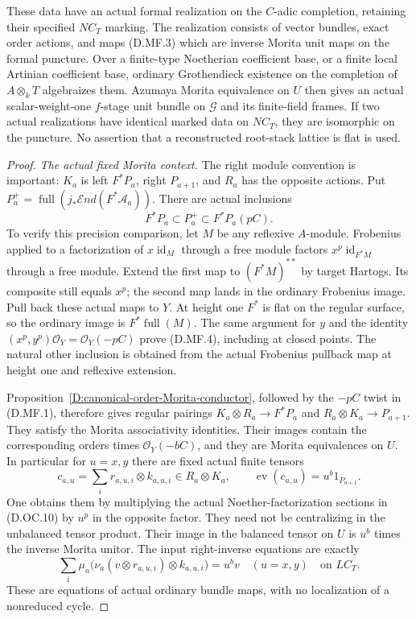 \begin{theorem}
These data have an actual formal realization on the
$C$-adic completion, retaining their specified $NC_T$ marking.
The realization consists of vector bundles, exact order
actions, and maps (D.MF.3) which are inverse Morita unit maps
on the formal puncture. Over a finite-type Noetherian
coefficient base, or a finite local Artinian coefficient
base, ordinary Grothendieck existence on the completion of
$A\otimes_kT$ algebraizes them. Azumaya Morita equivalence
on $U$ then gives an actual scalar-weight-one $f$-stage
unit bundle on $\mathcal G$ and its finite-field frames.
If two actual realizations have identical marked data on
$NC_T$, they are isomorphic on the puncture. No assertion
that a reconstructed root-stack lattice is flat is used.
\end{theorem}

\begin{proof}
\emph{The actual fixed Morita context.}
The right module convention is important:
$K_a$ is left $F^*P_a$, right $P_{a+1}$, and $R_a$ has the
opposite actions. Put
$P_a^+=\operatorname{full}(j_*\mathcal End(F^*\mathcal A_a))$.
There are actual inclusions
\[
                 F^*P_a\subset P_a^+\subset F^*P_a(pC).
                                                        \tag{D.MF.4}
\]
To verify this precision comparison, let $M$ be any reflexive
$A$-module. Frobenius applied to a factorization of
$x\operatorname{id}_M$ through a free module factors
$x^p\operatorname{id}_{F^*M}$ through a free module.
Extend the first map to $(F^*M)^{**}$ by target Hartogs.
Its composite still equals $x^p$; the second map lands in
the ordinary Frobenius image. Pull back these actual maps
to $Y$. At height one $F^*$ is flat on the regular surface,
so the ordinary image is $F^*\operatorname{full}(M)$.
The same argument for $y$ and the identity
$(x^p,y^p)\mathcal O_Y=\mathcal O_Y(-pC)$ prove (D.MF.4),
including at closed points. The natural other inclusion
is obtained from the actual Frobenius pullback map at
height one and reflexive extension.

Proposition~\ref{D:canonical-order-Morita-conductor}, followed
by the $-pC$ twist in (D.MF.1), therefore gives regular
pairings
$K_a\otimes R_a\to F^*P_a$ and
$R_a\otimes K_a\to P_{a+1}$.
They satisfy the Morita associativity identities. Their
images contain the corresponding orders times
$\mathcal O_Y(-bC)$, and they are Morita equivalences on
$U$. In particular for $u=x,y$ there are fixed actual
finite tensors
\[
 c_{a,u}=\sum_i r_{a,u,i}\otimes k_{a,u,i}\in R_a\otimes K_a,
 \qquad \operatorname{ev}(c_{a,u})=u^b1_{P_{a+1}}.
                                                        \tag{D.MF.5}
\]
One obtains them by multiplying the actual Noether-factorization
sections in (D.OC.10) by $u^p$ in the opposite factor.
They need not be centralizing in the unbalanced tensor
product. Their image in the balanced tensor on $U$ is
$u^b$ times the inverse Morita unitor.
The input right-inverse equations are exactly
\[
 \sum_i\mu_a\bigl(\nu_a(v\otimes r_{a,u,i})
                          \otimes k_{a,u,i}\bigr)=u^b v
       \quad(u=x,y)\quad\text{on }LC_T.               \tag{D.MF.6}
\]
These are equations of actual ordinary bundle maps, with
no localization of a nonreduced cycle.


\end{proof}
